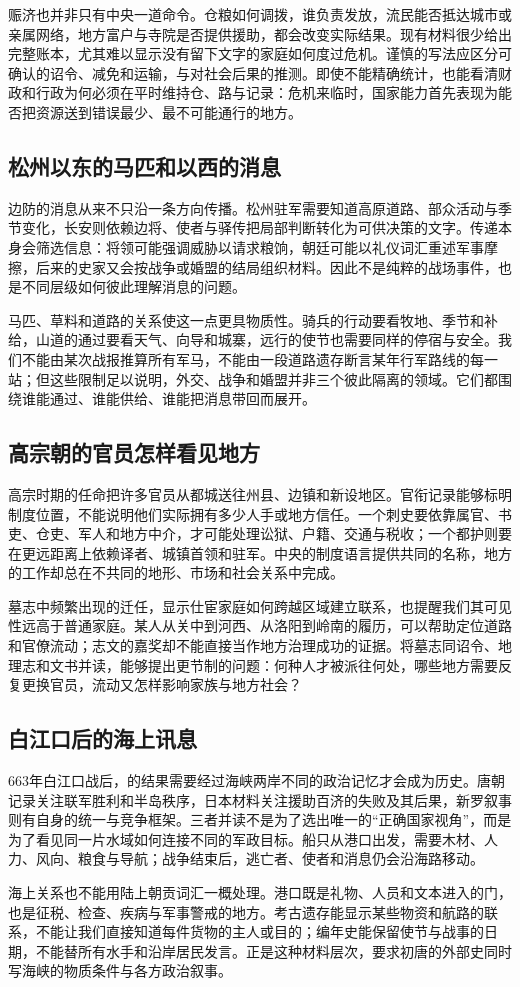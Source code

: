 赈济也并非只有中央一道命令。仓粮如何调拨，谁负责发放，流民能否抵达城市或亲属网络，地方富户与寺院是否提供援助，都会改变实际结果。现有材料很少给出完整账本，尤其难以显示没有留下文字的家庭如何度过危机。谨慎的写法应区分可确认的诏令、减免和运输，与对社会后果的推测。即使不能精确统计，也能看清财政和行政为何必须在平时维持仓、路与记录：危机来临时，国家能力首先表现为能否把资源送到错误最少、最不可能通行的地方。

\subsection{松州以东的马匹和以西的消息}
边防的消息从来不只沿一条方向传播。松州驻军需要知道高原道路、部众活动与季节变化，长安则依赖边将、使者与驿传把局部判断转化为可供决策的文字。传递本身会筛选信息：将领可能强调威胁以请求粮饷，朝廷可能以礼仪词汇重述军事摩擦，后来的史家又会按战争或婚盟的结局组织材料。因此不是纯粹的战场事件，也是不同层级如何彼此理解消息的问题。

马匹、草料和道路的关系使这一点更具物质性。骑兵的行动要看牧地、季节和补给，山道的通过要看天气、向导和城寨，远行的使节也需要同样的停宿与安全。我们不能由某次战报推算所有军马，不能由一段道路遗存断言某年行军路线的每一站；但这些限制足以说明，外交、战争和婚盟并非三个彼此隔离的领域。它们都围绕谁能通过、谁能供给、谁能把消息带回而展开。

\subsection{高宗朝的官员怎样看见地方}
高宗时期的任命把许多官员从都城送往州县、边镇和新设地区。官衔记录能够标明制度位置，不能说明他们实际拥有多少人手或地方信任。一个刺史要依靠属官、书吏、仓吏、军人和地方中介，才可能处理讼狱、户籍、交通与税收；一个都护则要在更远距离上依赖译者、城镇首领和驻军。中央的制度语言提供共同的名称，地方的工作却总在不共同的地形、市场和社会关系中完成。

墓志中频繁出现的迁任，显示仕宦家庭如何跨越区域建立联系，也提醒我们其可见性远高于普通家庭。某人从关中到河西、从洛阳到岭南的履历，可以帮助定位道路和官僚流动；志文的嘉奖却不能直接当作地方治理成功的证据。将墓志同诏令、地理志和文书并读，能够提出更节制的问题：何种人才被派往何处，哪些地方需要反复更换官员，流动又怎样影响家族与地方社会？

\subsection{白江口后的海上讯息}
663年白江口战后，的结果需要经过海峡两岸不同的政治记忆才会成为历史。唐朝记录关注联军胜利和半岛秩序，日本材料关注援助百济的失败及其后果，新罗叙事则有自身的统一与竞争框架。三者并读不是为了选出唯一的“正确国家视角”，而是为了看见同一片水域如何连接不同的军政目标。船只从港口出发，需要木材、人力、风向、粮食与导航；战争结束后，逃亡者、使者和消息仍会沿海路移动。

海上关系也不能用陆上朝贡词汇一概处理。港口既是礼物、人员和文本进入的门，也是征税、检查、疾病与军事警戒的地方。考古遗存能显示某些物资和航路的联系，不能让我们直接知道每件货物的主人或目的；编年史能保留使节与战事的日期，不能替所有水手和沿岸居民发言。正是这种材料层次，要求初唐的外部史同时写海峡的物质条件与各方政治叙事。
